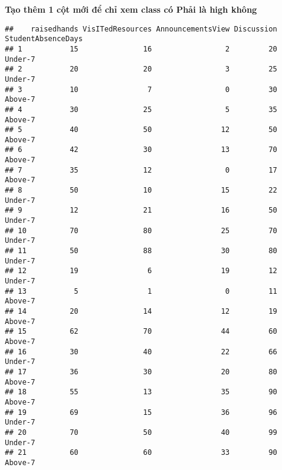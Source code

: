 \documentclass[
]{article}
\newenvironment{Shaded}{\begin{snugshade}}{\end{snugshade}}
\newcommand{\AttributeTok}[1]{\textcolor[rgb]{0.77,0.63,0.00}{#1}}
\newcommand{\DecValTok}[1]{\textcolor[rgb]{0.00,0.00,0.81}{#1}}
\newcommand{\FunctionTok}[1]{\textcolor[rgb]{0.00,0.00,0.00}{#1}}
\newcommand{\NormalTok}[1]{#1}
\newcommand{\OtherTok}[1]{\textcolor[rgb]{0.56,0.35,0.01}{#1}}
\newcommand{\SpecialCharTok}[1]{\textcolor[rgb]{0.00,0.00,0.00}{#1}}
\newcommand{\StringTok}[1]{\textcolor[rgb]{0.31,0.60,0.02}{#1}}
\begin{document}
\textbf{Tạo thêm 1 cột mới để chỉ xem class có Phải là high không}

\begin{Shaded}
\end{Shaded}

\begin{verbatim}
##    raisedhands VisITedResources AnnouncementsView Discussion StudentAbsenceDays
## 1           15               16                 2         20            Under-7
## 2           20               20                 3         25            Under-7
## 3           10                7                 0         30            Above-7
## 4           30               25                 5         35            Above-7
## 5           40               50                12         50            Above-7
## 6           42               30                13         70            Above-7
## 7           35               12                 0         17            Above-7
## 8           50               10                15         22            Under-7
## 9           12               21                16         50            Under-7
## 10          70               80                25         70            Under-7
## 11          50               88                30         80            Under-7
## 12          19                6                19         12            Under-7
## 13           5                1                 0         11            Above-7
## 14          20               14                12         19            Above-7
## 15          62               70                44         60            Above-7
## 16          30               40                22         66            Under-7
## 17          36               30                20         80            Above-7
## 18          55               13                35         90            Above-7
## 19          69               15                36         96            Under-7
## 20          70               50                40         99            Under-7
## 21          60               60                33         90            Above-7

\end{verbatim}
\end{document}
